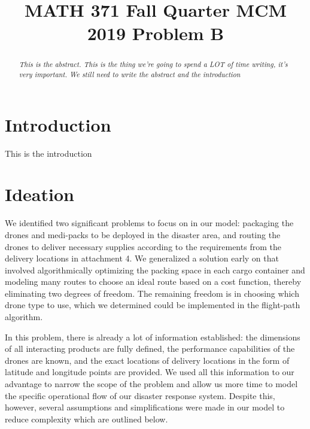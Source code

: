 \documentclass[twocolumn,10pt]{asme2ej}
\title{MATH 371 Fall Quarter MCM 2019 Problem B}
\begin{document}
\maketitle


\begin{abstract}
{\it This is the abstract. This is the thing we're going to spend a LOT of time writing, it's very important. We still need to write the abstract and the introduction
}
\end{abstract}



\section{Introduction}

This is the introduction

\section{Ideation}
We identified two significant problems to focus on in our model: packaging the drones and medi-packs to be deployed in the disaster area, and routing the drones to deliver necessary supplies according to the requirements from the delivery locations in attachment 4. We generalized a solution early on that involved algorithmically optimizing the packing space in each cargo container and modeling many routes to choose an ideal route based on a cost function, thereby eliminating two degrees of freedom. The remaining freedom is in choosing which drone type to use, which we determined could be implemented in the flight-path algorithm.

In this problem, there is already a lot of information established: the dimensions of all interacting products are fully defined, the performance capabilities of the drones are known, and the exact locations of delivery locations in the form of latitude and longitude points are provided. We used all this information to our advantage to narrow the scope of the problem and allow us more time to model the specific operational flow of our disaster response system. Despite this, however, several assumptions and simplifications were made in our model to reduce complexity which are outlined below.
\end{document}
